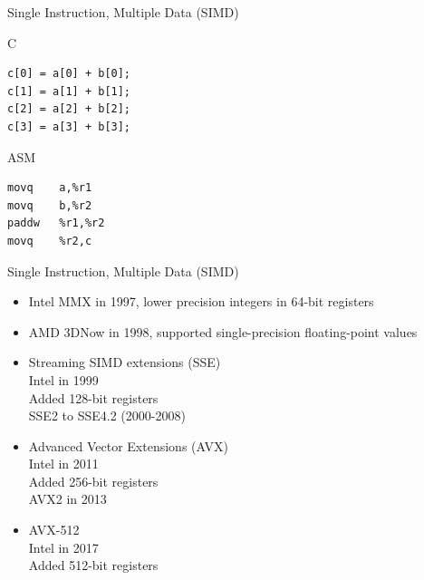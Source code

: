 \documentclass[UKenglish]{beamer}
\begin{document}
\begin{frame}[fragile,c]{Single Instruction, Multiple Data (SIMD)}
    \pause
    \begin{exampleblock}{C}
        \begin{verbatim}
c[0] = a[0] + b[0];
c[1] = a[1] + b[1];
c[2] = a[2] + b[2];
c[3] = a[3] + b[3];
\end{verbatim}
    \end{exampleblock}
    \pause
    \vfill
    \begin{exampleblock}{ASM}
        \begin{verbatim}
movq    a,%r1
movq    b,%r2
paddw   %r1,%r2
movq    %r2,c
\end{verbatim}
    \end{exampleblock}
\end{frame}

\begin{frame}[c]{Single Instruction, Multiple Data (SIMD)}
    \begin{itemize}
        \item Intel MMX in 1997, lower precision integers in 64-bit registers
              \pause
        \item AMD 3DNow in 1998, supported single-precision floating-point
              values
              \pause
        \item Streaming SIMD extensions (SSE) \\ Intel in 1999 \\ \alert{Added
                  128-bit registers} \\ SSE2 to SSE4.2 (2000-2008)
              \pause
        \item Advanced Vector Extensions (AVX) \\ Intel in 2011 \\ \alert{Added
                  256-bit registers} \\ AVX2 in 2013
              \pause
        \item AVX-512 \\ Intel in 2017 \\ \alert{Added 512-bit registers}
    \end{itemize}
\end{frame}
\end{document}
